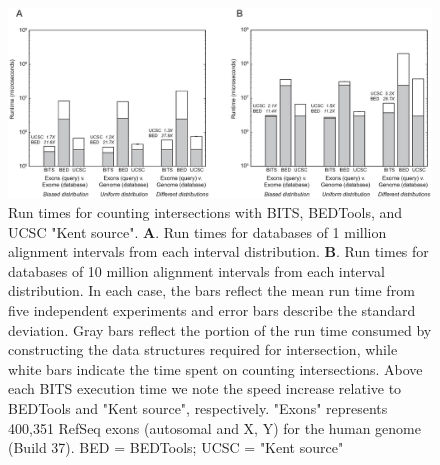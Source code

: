 \documentclass{bioinfo}
\begin{document}
        \begin{figure}[!h]
                \centering
                \includegraphics[width=7in]{figures/seq-counting.eps}
                \caption[]{Run times for counting intersections with 
                           BITS, BEDTools, and UCSC "Kent source".
                           \textbf{A}. Run times for databases of
                           1 million alignment intervals from each 
                           interval distribution.
                           \textbf{B}. Run times for databases of
                           10 million alignment intervals from each
                           interval distribution.
                           In each case, the bars reflect the mean
                           run time from five independent experiments
                           and error bars describe the standard deviation.
                           Gray bars reflect the portion of the run time
                           consumed by constructing the data structures
                           required for intersection, while white bars
                           indicate the time spent on counting intersections.
                           Above each BITS execution time we note the speed
                           increase relative to BEDTools and "Kent source",
                           respectively. "Exons" represents 400,351 RefSeq exons 
                           (autosomal and X, Y) for the human genome (Build 37).
                           BED = BEDTools; UCSC = "Kent source"}
        \end{figure}
        
\end{document}
